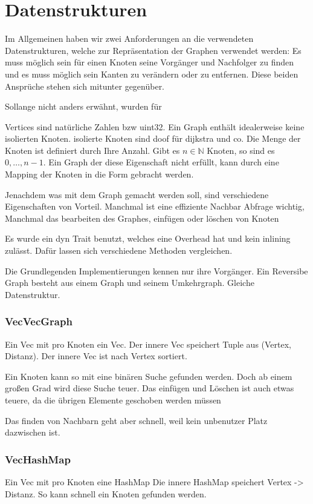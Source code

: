 \chapter{Datenstrukturen}

Im Allgemeinen haben wir zwei Anforderungen an die verwendeten Datenstrukturen, welche zur Repräsentation der Graphen verwendet werden: Es muss möglich sein für einen Knoten seine Vorgänger und Nachfolger zu finden und es muss möglich sein Kanten zu verändern oder zu entfernen.
Diese beiden Ansprüche stehen sich mitunter gegenüber.

Sollange nicht anders erwähnt, wurden für

Vertices sind natürliche Zahlen bzw uint32.
Ein Graph enthält idealerweise keine isolierten Knoten.
isolierte Knoten sind doof für dijkstra und co.
Die Menge der Knoten ist definiert durch Ihre Anzahl.
Gibt es $n \in \mathbb{N}$ Knoten, so sind es $0, \dotsc, n - 1$.
Ein Graph der diese Eigenschaft nicht erfüllt, kann durch eine Mapping der Knoten in die Form gebracht werden.

Jenachdem was mit dem Graph gemacht werden soll, sind verschiedene Eigenschaften von Vorteil.
Manchmal ist eine effiziente Nachbar Abfrage wichtig,
Manchmal das bearbeiten des Graphes, einfügen oder löschen von Knoten

Es wurde ein dyn Trait benutzt, welches eine Overhead hat und kein inlining zulässt.
Dafür lassen sich verschiedene Methoden vergleichen.

Die Grundlegenden Implementierungen kennen nur ihre Vorgänger.
Ein Reversibe Graph besteht aus einem Graph und seinem Umkehrgraph.
Gleiche Datenstruktur.

\subsection{VecVecGraph}
Ein Vec mit pro Knoten ein Vec.
Der innere Vec speichert Tuple aus (Vertex, Distanz).
Der innere Vec ist nach Vertex sortiert.

Ein Knoten kann so mit eine binären Suche gefunden werden.
Doch ab einem großen Grad wird diese Suche teuer.
Das einfügen und Löschen ist auch etwas teuere, da die übrigen Elemente geschoben werden müssen

Das finden von Nachbarn geht aber schnell, weil kein unbenutzer Platz dazwischen ist.

\subsection{VecHashMap}
Ein Vec mit pro Knoten eine HashMap
Die innere HashMap speichert Vertex -> Distanz.
So kann schnell ein Knoten gefunden werden.

